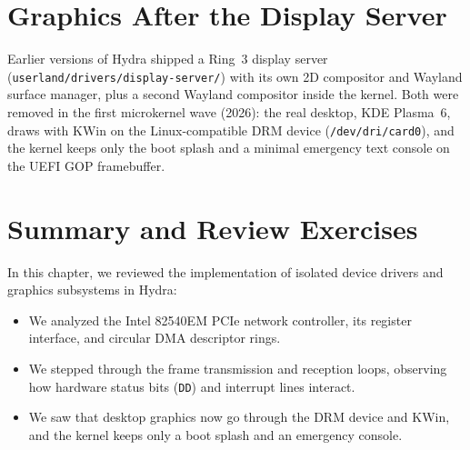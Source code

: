 \section{Graphics After the Display Server}
\label{sec:code_display_annotated}

Earlier versions of Hydra shipped a Ring~3 display server (\texttt{userland/drivers/display-server/}) with its own 2D compositor and Wayland surface manager, plus a second Wayland compositor inside the kernel. Both were removed in the first microkernel wave (2026): the real desktop, KDE Plasma~6, draws with KWin on the Linux-compatible DRM device (\texttt{/dev/dri/card0}), and the kernel keeps only the boot splash and a minimal emergency text console on the UEFI GOP framebuffer.

\section{Summary and Review Exercises}
\label{sec:drivers_exercises}

In this chapter, we reviewed the implementation of isolated device drivers and graphics subsystems in Hydra:
\begin{itemize}
    \item We analyzed the Intel 82540EM PCIe network controller, its register interface, and circular DMA descriptor rings.
    \item We stepped through the frame transmission and reception loops, observing how hardware status bits (\texttt{DD}) and interrupt lines interact.
    \item We saw that desktop graphics now go through the DRM device and KWin, and the kernel keeps only a boot splash and an emergency console.
\end{itemize}

